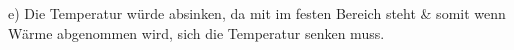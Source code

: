 e) Die Temperatur würde absinken, da mit im festen Bereich 
steht & somit wenn Wärme abgenommen wird, sich die 
Temperatur senken muss.